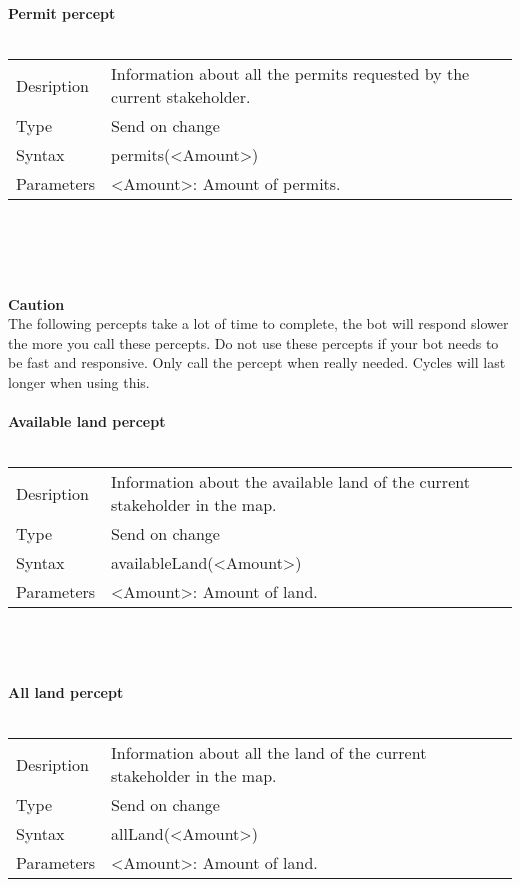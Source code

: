 \documentclass[english,11pt]{report}
\begin{document}
\newpage
\textbf{Permit percept}\\
\\
\begin{tabularx}{\textwidth}{lX}
 Desription & Information about all the permits requested by the current stakeholder. \\
 Type & Send on change \\
 Syntax & permits(<Amount>) \\
 Parameters &   <Amount>: Amount of permits.
\end{tabularx}\\
\\
\\
\\
\textbf{Caution}\\
The following percepts take a lot of time to complete, the bot will respond slower the more you call these percepts. Do not use these percepts if your bot needs to be fast and responsive. Only call the percept when really needed. Cycles will last longer when using this.
\\
\\
\textbf{Available land percept}\\
\\
\begin{tabularx}{\textwidth}{lX}
 Desription & Information about the available land of the current stakeholder in the map. \\
 Type & Send on change \\
 Syntax & availableLand(<Amount>) \\
 Parameters &   <Amount>: Amount of land.
\end{tabularx}\\
\\
\\
\textbf{All land percept}\\
\\
\begin{tabularx}{\textwidth}{lX}
 Desription & Information about all the land of the current stakeholder in the map. \\
 Type & Send on change \\
 Syntax & allLand(<Amount>) \\
 Parameters &   <Amount>: Amount of land.
\end{tabularx}\\
\\
\\


\end{document}
